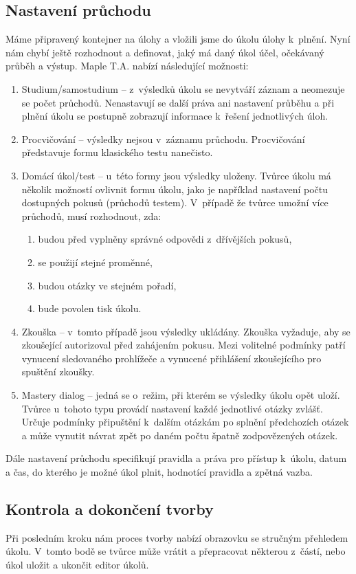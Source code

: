 \documentclass[
print,
  11pt,
  table,   
  nolof,    
  nolot,
  oneside,
  draft
]{fithesis3}
\begin{document}
\subsection*{Nastavení průchodu}
Máme připravený kontejner na úlohy a vložili jsme do úkolu úlohy k~plnění. Nyní nám chybí ještě rozhodnout a definovat, jaký má daný úkol účel, očekávaný průběh a výstup. Maple T.A. nabízí následující možnosti: 
\begin{enumerate}
	\item Studium/samostudium -- z~výsledků úkolu se nevytváří záznam a neomezuje se počet průchodů. Nenastavují se další práva ani nastavení průběhu a při plnění úkolu se postupně zobrazují informace k~řešení jednotlivých úloh.
	\item Procvičování -- výsledky nejsou v~záznamu průchodu. Procvičování představuje formu klasického testu nanečisto.
	\item Domácí úkol/test -- u~této formy jsou výsledky uloženy. Tvůrce úkolu má několik možností ovlivnit formu úkolu, jako je například nastavení počtu dostupných pokusů (průchodů testem). V~případě že tvůr\-ce umožní více průchodů, musí rozhodnout, zda:
	\begin{enumerate}
		\item budou před vyplněny správné odpovědi z~dřívějších pokusů, 
		\item se použijí stejné proměnné, 
		\item budou otázky ve stejném pořadí, 
		\item bude povolen tisk úkolu.
	\end{enumerate}
	\item Zkouška -- v~tomto případě jsou výsledky ukládány. Zkouš\-ka vyžaduje, aby se zkoušející autorizoval před zahájením pokusu. Mezi volitelné podmínky patří vynucení sledovaného prohlížeče a vynucené přihlášení zkoušejícího pro spuštění zkoušky.
	\item Mastery dialog -- jedná se o~režim, při kterém se výsledky úkolu opět uloží. Tvůr\-ce u~tohoto typu provádí nastavení každé jednotlivé otáz\-ky zvlášť. Určuje podmínky připuštění k~dalším otázkám po splnění předchozích otázek a může vynutit návrat zpět po daném počtu špat\-ně zodpovězených otázek.
\end{enumerate}
Dále nastavení průchodu specifikují pravidla a práva pro přístup k~úkolu, datum a čas, do kterého je možné úkol plnit, hodnotící pravidla a zpětná vazba.
 
\subsection*{Kontrola a dokončení tvorby}
Při posledním kroku nám proces tvorby nabízí obrazovku se stručným přehledem úkolu. V~tomto bodě se tvůrce může vrátit a přepracovat některou z~částí, nebo úkol uložit a ukončit editor úkolů.
\end{document}
